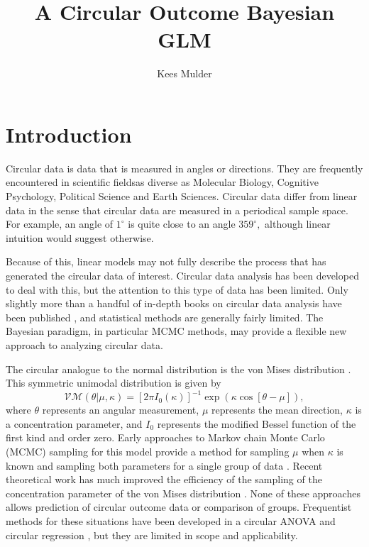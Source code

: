 \documentclass[12pt,a4paper]{article}\usepackage[]{graphicx}\usepackage[]{color}
\author{Kees Mulder}
\title{A Circular Outcome Bayesian GLM}
\begin{document}
\maketitle




\section{Introduction}

Circular data is data that is measured in angles or directions. They are frequently encountered in scientific fieldsas diverse as Molecular Biology, Cognitive Psychology, Political Science \citep{gill2010} and Earth Sciences. Circular data differ from linear data in the sense that circular data are measured in a periodical sample space. For example, an angle of $1^{\circ}$ is quite close to an angle $359^{\circ},$ although linear intuition would suggest otherwise.

Because of this, linear models may not fully describe the process that has generated the circular data of interest. Circular data analysis has been developed to deal with this, but the attention to this type of data has been limited. Only slightly more than a handful of in-depth books on circular data analysis have been published \citep{fisher1995statistical,mardia1999directional,pewsey2013circular}, and statistical methods are generally fairly limited. The Bayesian paradigm, in particular MCMC methods, may provide a flexible new approach to analyzing circular data.

The circular analogue to the normal distribution is the von Mises distribution \citep{von1918ganzzahligkeit}. This symmetric unimodal distribution is given by
\begin{equation}
\mathcal{VM}(\theta \vert \mu, \kappa) = \left[ 2 \pi I_0(\kappa) \right]^{-1}
\exp \left( \kappa \cos \left[ \theta - \mu \right] \right),
\end{equation}
where $\theta$ represents an angular measurement, $\mu$ represents the mean direction, $\kappa$ is a concentration parameter, and $I_0$ represents the modified Bessel function of the first kind and order zero. Early approaches to Markov chain Monte Carlo (MCMC) sampling for this model provide a method for sampling $\mu$ when $\kappa$ is known \citep{mardia1976bayesian} and sampling both parameters for a single group of data \citep{damien1999fullbayes}. Recent theoretical work has much improved the efficiency of the sampling of the concentration parameter of the von Mises distribution \citep{forbes2014fast}. None of these approaches allows prediction of circular outcome data or comparison of groups. Frequentist methods for these situations have been developed in a circular ANOVA \citep{harrison1986analysis,harrison1988development} and circular regression \citep{fisher1992regression}, but they are limited in scope and applicability.
\end{document}
